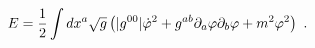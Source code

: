 \begin{equation}
E= {1 \over 2}\int dx^a \sqrt{g}\left( |g^{00}|\dot{\varphi}^2
+ g^{ab}\partial_a\varphi \partial_b\varphi + m^2 \varphi^2\right)\ .
\label{energy}
\end{equation}


